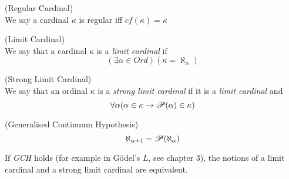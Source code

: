 \begin{definition}{(Regular Cardinal)}\label{def:regular_cardinal}\\
We say a cardinal $\kappa$ is regular iff $cf(\kappa) = \kappa$
\end{definition}

\begin{definition}{(Limit Cardinal)}\label{def:limit_ordinal}\\
We say that a cardinal $\kappa$ is a \emph{limit cardinal} if
\begin{equation}
(\exists \alpha \in Ord)(\kappa = \aleph_\alpha)
\end{equation}
\end{definition}

\begin{definition}{(Strong Limit Cardinal)}\label{def:limit_ordinal}\\
We say that an ordinal $\kappa$ is a \emph{strong limit cardinal} if it is a \emph{limit cardinal} and 
\begin{equation}
\forall \alpha (\alpha \in \kappa \rightarrow \mathscr{P} (\alpha) \in \kappa)
\end{equation}
\end{definition}

\begin{definition}{(Generalised Continuum Hypothesis)}\\
\begin{equation}
\aleph_{\alpha+1}=\mathscr{P} (\aleph_\alpha)
\end{equation}
\end{definition}
If \emph{GCH} holds (for example in Gödel's $L$, see chapter 3), the notions of a limit cardinal and a strong limit cardinal are equivalent.

\

